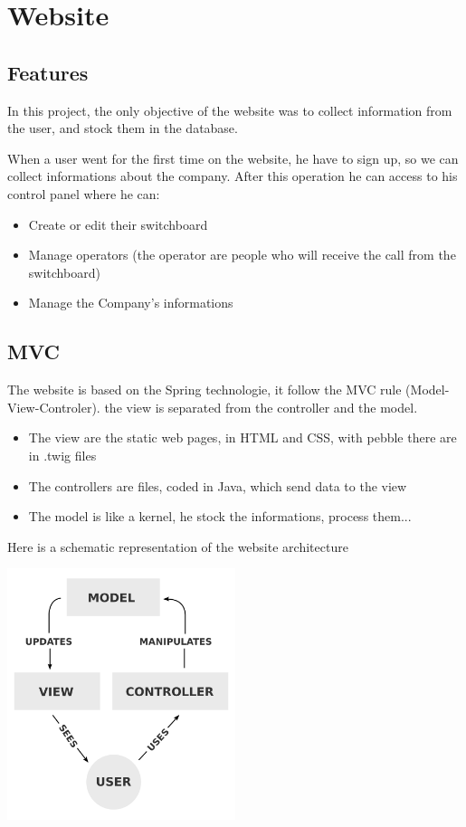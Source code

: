 \chapter{Website}
\section{Features}
In this project, the only objective of the website was to collect information from the user, and stock them in the database.

When a user went for the first time on the website, he have to sign up, so we can collect informations about the company. After this operation he can access to his control panel where he can:
\begin{itemize}  
\item Create or edit their switchboard
\item Manage operators (the operator are people who will receive the call from the switchboard)
\item Manage the Company's informations
\end{itemize}  





\section{MVC}
The website is based on the Spring technologie,  it follow the MVC rule (Model-View-Controler). the view is separated from the controller and the model.

\begin{itemize}  
\item The view are the static web pages, in HTML and CSS, with pebble there are in .twig files
\item The controllers are files, coded in Java, which send data to the view
\item The model is like a kernel, he stock the informations, process them...

\end{itemize}  

Here is a schematic representation of the website architecture

\includegraphics[width=0.50\textwidth]{img/mvc.png}




